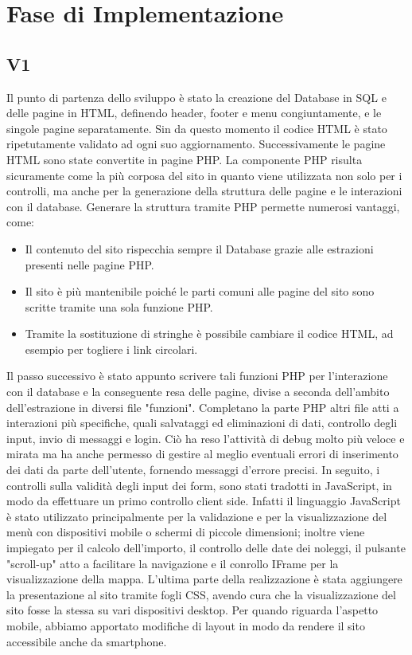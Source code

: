 \section{Fase di Implementazione}

\subsection{V1}
Il punto di partenza dello sviluppo è stato la creazione del Database in SQL e delle pagine in HTML, definendo header, footer e menu congiuntamente, e le singole pagine separatamente. Sin da questo momento il codice HTML è stato ripetutamente validato ad ogni suo aggiornamento. Successivamente le pagine HTML sono state convertite in pagine PHP.
La componente PHP risulta sicuramente come la più corposa del sito in quanto viene utilizzata non solo per i controlli, ma anche per la generazione della struttura delle pagine e le interazioni con il database.
Generare la struttura tramite PHP permette numerosi vantaggi, come:
\begin{itemize}
    \item Il contenuto del sito rispecchia sempre il Database grazie alle estrazioni presenti nelle pagine PHP.
    \item Il sito è più mantenibile poiché le parti comuni alle pagine del sito sono scritte tramite una sola funzione PHP.
    \item Tramite la sostituzione di stringhe è possibile cambiare il codice HTML, ad esempio per togliere i link circolari.
\end{itemize}
Il passo successivo è stato appunto scrivere tali funzioni PHP per l’interazione con il database e la conseguente resa delle pagine, divise a seconda dell'ambito dell'estrazione in diversi file "funzioni". Completano la parte PHP altri file atti a interazioni più specifiche, quali salvataggi ed eliminazioni di dati, controllo degli input, invio di messaggi e login.
Ciò ha reso l’attività di debug molto più veloce e mirata ma ha anche permesso di gestire al meglio eventuali errori di inserimento dei dati da parte dell’utente, fornendo messaggi d’errore precisi. In seguito, i controlli sulla validità degli input dei form, sono stati tradotti in JavaScript, in modo da effettuare un primo controllo client side.
Infatti il linguaggio JavaScript è stato utilizzato principalmente per la validazione e per la visualizzazione del menù con dispositivi mobile o schermi di piccole dimensioni; inoltre viene impiegato per il calcolo dell'importo, il controllo delle date dei noleggi, il pulsante "scroll-up" atto a facilitare la navigazione e il conrollo IFrame per la visualizzazione della mappa.
L’ultima parte della realizzazione è stata aggiungere la presentazione al sito tramite fogli CSS, avendo cura che la visualizzazione del sito fosse la stessa su vari dispositivi desktop. Per quando riguarda l’aspetto mobile, abbiamo apportato modifiche di layout in modo da rendere il sito accessibile anche da smartphone.

